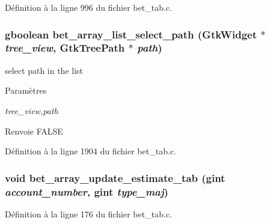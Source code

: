 Définition à la ligne 996 du fichier bet\_\-tab.c.

\subsubsection[{bet\_\-array\_\-list\_\-select\_\-path}]{\setlength{\rightskip}{0pt plus 5cm}gboolean bet\_\-array\_\-list\_\-select\_\-path (GtkWidget $\ast$ {\em tree\_\-view}, \/  GtkTreePath $\ast$ {\em path})}\label{bet__tab_8h_ad6a44874943998f49cc24bda305c961b}
select path in the list


\begin{DoxyParams}{Paramètres}
\item[{\em tree\_\-view,path}]\end{DoxyParams}
\begin{DoxyReturn}{Renvoie}
FALSE 
\end{DoxyReturn}


Définition à la ligne 1904 du fichier bet\_\-tab.c.

\subsubsection[{bet\_\-array\_\-update\_\-estimate\_\-tab}]{\setlength{\rightskip}{0pt plus 5cm}void bet\_\-array\_\-update\_\-estimate\_\-tab (gint {\em account\_\-number}, \/  gint {\em type\_\-maj})}\label{bet__tab_8h_a333b7b726d6915f02a6a8bb93365046b}


Définition à la ligne 176 du fichier bet\_\-tab.c.

